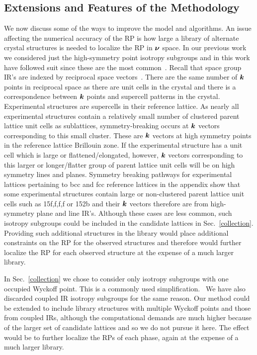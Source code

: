 \documentclass[preprint]{revtex4}
\newcommand{\mb}[1]{\ensuremath{\mbox{\boldmath $ #1 $}}}
\begin{document}
\subsection{Extensions and Features of the Methodology}
\label{extensions}

We now discuss some of the ways to improve the model and algorithms.
An issue affecting the numerical accuracy of the RP is how large a
library of alternate crystal structures is needed to localize the RP
in $\mb{\nu}$ space. In our previous work~\cite{Mettes04} we
considered just the high-symmetry point isotropy subgroups and in
this work have followed suit since these are the most
common~\cite{Stokes88}. Recall that space group IR's are indexed by
reciprocal space vectors~\cite{Kovalev93,Zak69}. There are the same
number of $\mb{k}$ points in reciprocal space as there are unit
cells in the crystal and there is a correspondence between $\mb{k}$
points and supercell patterns in the crystal. Experimental
structures are supercells in their reference lattice. As nearly all
experimental structures contain a relatively small number of
clustered parent lattice unit cells as sublattices,
symmetry-breaking occurs at $\mb{k}$ vectors corresponding to this
small cluster.  These are $\mb{k}$ vectors at high symmetry points
in the reference lattice Brillouin zone. If the experimental
structure has a unit cell which is large or flattened/elongated,
however, $\mb{k}$ vectors corresponding to this larger or
longer/flatter group of parent lattice unit cells will be on high
symmetry lines and planes. Symmetry breaking pathways for experimental lattices
pertaining to bcc and fcc reference lattices in the appendix show that some experimental structures contain
large or non-clustered parent lattice unit cells such as 15f,f,f,f
or 152b and their $\mb{k}$ vectors therefore are from high-symmetry
plane and line IR's. Although these cases are less common, such
isotropy subgroups could be included in the candidate lattices in
Sec.~\ref{collection}. Providing such additional structures in the
library would place additional constraints on the RP for the
observed structures and therefore would further localize the RP for each
observed structure at the expense of a much larger library.

In Sec.~\ref{collection} we chose to consider only isotropy
subgroups with one occupied Wyckoff point. This is a commonly used
simplification.~\cite{Verwer98} We have also discarded coupled IR
isotropy subgroups for the same reason. Our method could be extended
to include library structures with multiple Wyckoff points and those
from coupled IRs, although the computational demands are much higher
because of the larger set of candidate lattices and so we do not
pursue it here. The effect would be to further localize the RPs of
each phase, again at the expense of a much larger library.
\end{document}
